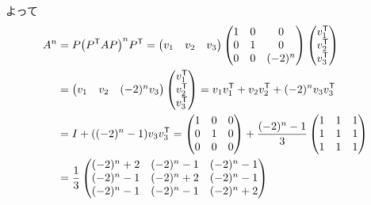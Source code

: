 \documentclass[../ap_2012.tex]{subfiles}
\begin{document}
よって
\begin{equation}\begin{aligned}[b]
    A^n &= P\qty(P^\mathsf{T}AP)^n P^\mathsf{T}
    =\begin{pmatrix}
        v_1 & v_2 & v_3
    \end{pmatrix}\begin{pmatrix}
        1 & 0 & 0\\
        0 & 1 & 0\\
        0 & 0 & (-2)^n
    \end{pmatrix}\begin{pmatrix}
        v_1^\mathsf{T}\\
        v_2^\mathsf{T}\\
        v_3^\mathsf{T}\\
    \end{pmatrix}\\
    &=\begin{pmatrix}
        v_1 & v_2 & (-2)^nv_3
    \end{pmatrix}\begin{pmatrix}
        v_1^\mathsf{T}\\
        v_2^\mathsf{T}\\
        v_3^\mathsf{T}\\
    \end{pmatrix}
    = v_1v_1^\mathsf{T} + v_2v_2^\mathsf{T} + (-2)^nv_3v_3^\mathsf{T}\\
    &= I + ((-2)^n-1)v_3v_3^\mathsf{T}
    = \begin{pmatrix}
        1 & 0 & 0\\
        0 & 1 & 0\\
        0 & 0 & 0
    \end{pmatrix}
    +\frac{(-2)^n-1}{3}\begin{pmatrix}
        1 & 1 & 1\\
        1 & 1 & 1\\
        1 & 1 & 1
    \end{pmatrix}\\
    &=\frac{1}{3}\begin{pmatrix}
        (-2)^n+2 & (-2)^n-1 & (-2)^n-1\\
        (-2)^n-1 & (-2)^n+2 & (-2)^n-1\\
        (-2)^n-1 & (-2)^n-1 & (-2)^n+2
    \end{pmatrix}
\end{aligned}\end{equation}
\end{document}
